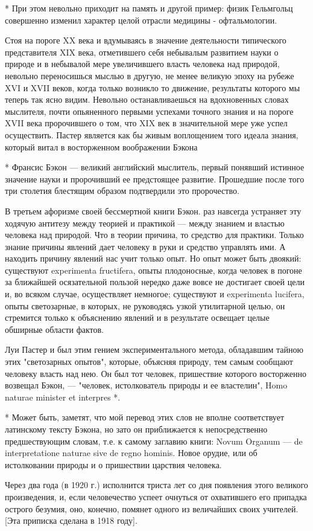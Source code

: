 * При этом невольно приходит на память и другой пример: физик
Гельмгольц совершенно изменил характер целой отрасли медицины -
офтальмологии.

Стоя на пороге XX века и вдумываясь в значение деятельности  типического
представителя XIX  века, отметившего  себя небывалым  развитием науки  о
природе и в  небывалой мере увеличившего  власть человека над  природой,
невольно переносишься мыслью в другую, не менее великую эпоху на рубеже
XVI и XVII веков, когда только возникло то движение, результаты которого
мы теперь  так ясно  видим.  Невольно останавливаешься  на  вдохновенных
словах мыслителя, почти опьяненного первыми успехами точного знания и на
пороге XVII века пророчившего о том, что XIX век в значительной мере уже
успел осуществить. Пастер является как бы живым воплощением того  идеала
знания, который витал в восторженном воображении Бэкона

* Франсис Бэкон --- великий английский мыслитель, первый понявший
истинное значение науки и пророчивший ее предстоящее развитие.
Прошедшие после того три столетия блестящим образом подтвердили это
пророчество.

В третьем афоризме своей бессмертной книги Бэкон. раз навсегда устраняет
эту ходячую антитезу между теорией и практикой --- между знанием и властью
человека над природой. Что в  теории причина, то средство для  практики.
Только знание причины явлений дает человеку в руки и средство  управлять
ими. А находить причину явлений нас учит только опыт. Но опыт может быть
двоякий: существуют  experimenta  fructifera, опыты  плодоносные,  когда
человек в погоне за ближайшей осязательной пользой нередко даже вовсе не
достигает  своей  цели  и,  во  всяком  случае,  осуществляет  немногое;
существуют и  experimenta lucifera,  опыты  светозарные, в  которых,  не
руководясь узкой  утилитарной целью,  он стремится  только к  объяснению
явлений и в результате освещает целые обширные области фактов.

Луи Пастер  и  был  этим гением  экспериментального  метода,  обладавшим
тайною этих "светозарных опытов",  которые, объясняя природу, тем  самым
сообщают человеку  власть  над  нею.  Он  был  тот  человек,  пришествие
которого восторженно возвещал Бэкон, --- "человек, истолкователь природы и
ее властелин", Homo naturae minister et interpres *.

* Может быть, заметят, что мой перевод этих слов не вполне
соответствует латинскому тексту Бэкона, но зато он приближается к
непосредственно предшествующим словам, т.е. к самому заглавию книги:
Novum Organum --- de interpretatione naturae sive de regno hominis.
Новое орудие, или об истолковании природы и о пришествии царствия
человека.

Через два  года (в  1920 г.)  исполнится триста  лет со  дня появления
этого великого  произведения, и, если человечество  успеет очнуться от
охватившего его припадка острого безумия, оно, конечно, помянет одного
из величайших своих учителей. [Эта приписка сделана в 1918 году].
